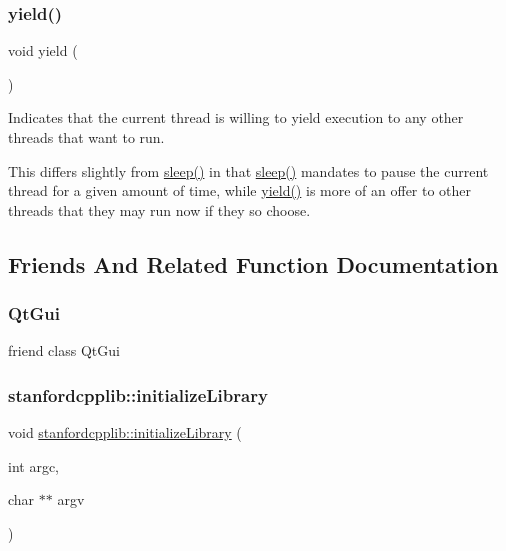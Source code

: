 \subsubsection{\texorpdfstring{yield()}{yield()}}
{\footnotesize\ttfamily void yield (\begin{DoxyParamCaption}{ }\end{DoxyParamCaption})\hspace{0.3cm}{\ttfamily [static]}}



Indicates that the current thread is willing to yield execution to any other threads that want to run. 

This differs slightly from \mbox{\hyperlink{classGThread_aa3381590c1ef33c08000c2fbb2bf0dd0}{sleep()}} in that \mbox{\hyperlink{classGThread_aa3381590c1ef33c08000c2fbb2bf0dd0}{sleep()}} mandates to pause the current thread for a given amount of time, while \mbox{\hyperlink{classGThread_a58c8b2ad0ea491a6642e5e1cbd358c89}{yield()}} is more of an offer to other threads that they may run now if they so choose. 

\subsection{Friends And Related Function Documentation}
\mbox{\label{classGThread_a78e6068a40352424a09cd3753706c619}} 
\subsubsection{\texorpdfstring{Qt\+Gui}{QtGui}}
{\footnotesize\ttfamily friend class Qt\+Gui\hspace{0.3cm}{\ttfamily [friend]}}

\mbox{\label{classGThread_a4f1fcd681e2cf92d1b04e5e8a33dbe47}} 
\subsubsection{\texorpdfstring{stanfordcpplib\+::initialize\+Library}{stanfordcpplib::initializeLibrary}}
{\footnotesize\ttfamily void \mbox{\hyperlink{namespacestanfordcpplib_ab36f2e19ed11765f2b025cc8e4636010}{stanfordcpplib\+::initialize\+Library}} (\begin{DoxyParamCaption}\item[{int}]{argc,  }\item[{char $\ast$$\ast$}]{argv }\end{DoxyParamCaption})\hspace{0.3cm}{\ttfamily [friend]}}



